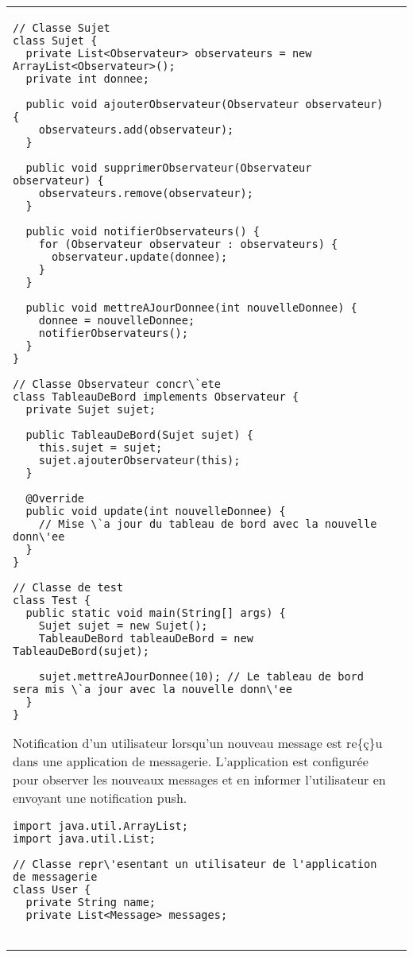 \begin{table}[H]
\begin{adjustbox}{max width=\textwidth}
\begin{tabular}{l|p{\textwidth}}
\begin{minipage}[tl]{0.5\textwidth}
\begin{minipage}[b]{1\textwidth}
\begin{lstlisting}[style=monstyle]
// Classe Sujet
class Sujet {
  private List<Observateur> observateurs = new ArrayList<Observateur>();
  private int donnee;

  public void ajouterObservateur(Observateur observateur) {
    observateurs.add(observateur);
  }

  public void supprimerObservateur(Observateur observateur) {
    observateurs.remove(observateur);
  }

  public void notifierObservateurs() {
    for (Observateur observateur : observateurs) {
      observateur.update(donnee);
    }
  }

  public void mettreAJourDonnee(int nouvelleDonnee) {
    donnee = nouvelleDonnee;
    notifierObservateurs();
  }
}

// Classe Observateur concr\`ete
class TableauDeBord implements Observateur {
  private Sujet sujet;

  public TableauDeBord(Sujet sujet) {
    this.sujet = sujet;
    sujet.ajouterObservateur(this);
  }

  @Override
  public void update(int nouvelleDonnee) {
    // Mise \`a jour du tableau de bord avec la nouvelle donn\'ee
  }
}

// Classe de test
class Test {
  public static void main(String[] args) {
    Sujet sujet = new Sujet();
    TableauDeBord tableauDeBord = new TableauDeBord(sujet);

    sujet.mettreAJourDonnee(10); // Le tableau de bord sera mis \`a jour avec la nouvelle donn\'ee
  }
}

\end{lstlisting} 
\end{minipage}
\end{minipage}
\hspace{6mm}
\begin{minipage}[tr]{0.5\textwidth}
\begin{minipage}[t]{1\textwidth}
Notification d'un utilisateur lorsqu'un nouveau message est re\{ç\}u dans une application de messagerie. L'application est configur\'ee pour observer les nouveaux messages et en informer l'utilisateur en envoyant une notification push.  
\end{minipage}
\begin{minipage}[b]{1\textwidth}
\begin{lstlisting}[style=monstyle]
import java.util.ArrayList;
import java.util.List;

// Classe repr\'esentant un utilisateur de l'application de messagerie
class User {
  private String name;
  private List<Message> messages;


\end{lstlisting}
\end{minipage}
\end{minipage}
\end{tabular}
\end{adjustbox}
\end{table}
